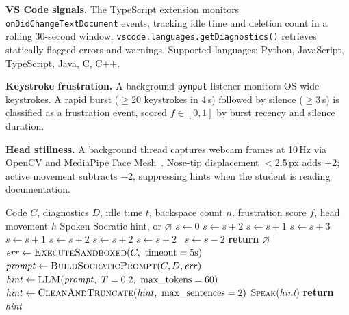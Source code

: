 \documentclass[sigconf,anonymous,review]{acmart}
\begin{document}
\textbf{VS Code signals.} The TypeScript extension monitors
\texttt{onDidChange\allowbreak TextDocument} events, tracking idle time
and deletion count in a rolling 30-second window.
\texttt{vscode.languages.\allowbreak getDiagnostics()} retrieves
statically flagged errors and warnings. Supported languages: Python,
JavaScript, TypeScript, Java, C, C++.

\textbf{Keystroke frustration.} A background \texttt{pynput} listener
monitors OS-wide keystrokes. A rapid burst ($\geq$20 keystrokes in 4\,s)
followed by silence ($\geq$3\,s) is classified as a frustration event,
scored $f\!\in\![0,1]$ by burst recency and silence duration.

\textbf{Head stillness.} A background thread captures webcam frames at
10\,Hz via OpenCV and MediaPipe Face Mesh~\cite{lugaresi2019}. Nose-tip
displacement $<$2.5\,px adds $+2$; active movement subtracts $-2$,
suppressing hints when the student is reading documentation.

\begin{algorithm}[t]
\small
\caption{EarCoach: Stuck Detection and Hint Delivery}
\label{alg:stuck}
\begin{algorithmic}[1]
\Require Code $C$, diagnostics $D$, idle time $t$,
         backspace count $n$, frustration score $f$, head movement $h$
\Ensure Spoken Socratic hint, or $\varnothing$
\State $s \leftarrow 0$
 $s \leftarrow s + 2$
 $s \leftarrow s + 1$ \EndIf
{} $s \leftarrow s + 3$ \EndIf
{} $s \leftarrow s + 1$ \EndIf
{} $s \leftarrow s + 2$ \EndIf
\hfill{}
 $s \leftarrow s + 2$ \EndIf
{} $s \leftarrow s + 2$
\Else\ $s \leftarrow s - 2$ \EndIf
\hfill{}
  \State \textbf{return} $\varnothing$
\EndIf
\State $\mathit{err} \leftarrow \textsc{ExecuteSandboxed}(C,\ \text{timeout}=5\text{s})$
\State $\mathit{prompt} \leftarrow \textsc{BuildSocraticPrompt}(C, D, \mathit{err})$
\State $\mathit{hint} \leftarrow \textsc{LLM}(\mathit{prompt},\ T=0.2,\ \text{max\_tokens}=60)$
\State $\mathit{hint} \leftarrow \textsc{CleanAndTruncate}(\mathit{hint},\ \text{max\_sentences}=2)$
\State \textsc{Speak}(\textit{hint}) \hfill{}
\State \textbf{return} \textit{hint}
\end{algorithmic}
\end{algorithm}
\end{document}
